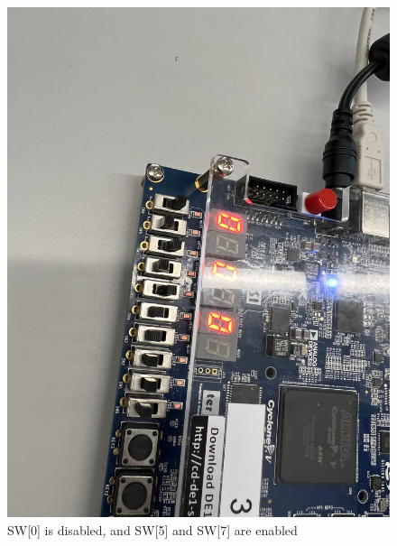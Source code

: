 \documentclass[
	letterpaper, %
	10pt, %
]{CSUniSchoolLabReport}
\begin{document}
\begin{figure}[H]
  \centering
  \includegraphics[width=.9\textwidth]{Figures/Three0.jpg}
  \caption{SW[0] is disabled, and SW[5] and SW[7] are enabled}
  \label{fig:16}
\end{figure}
\end{document}
